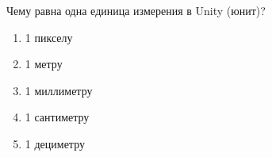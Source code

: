 
Чему равна одна единица измерения в Unity (юнит)?

\begin{enumerate}
    \item 1 пикселу
    \item 1 метру
    \item 1 миллиметру
    \item 1 сантиметру
    \item 1 дециметру
\end{enumerate}
